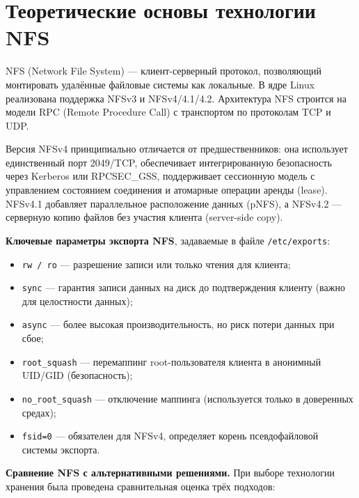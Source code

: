 \documentclass[14pt,a4paper]{extarticle}
\begin{document}
	\newpage
	
	\section{Теоретические основы технологии NFS}
	
	NFS (Network File System) --- клиент-серверный протокол, позволяющий монтировать
	удалённые файловые системы как локальные. В ядре Linux реализована поддержка NFSv3 и
	NFSv4/4.1/4.2. Архитектура NFS строится на модели RPC (Remote Procedure Call) с
	транспортом по протоколам TCP и UDP.
	
	Версия NFSv4 принципиально отличается от предшественников: она использует единственный
	порт 2049/TCP, обеспечивает интегрированную безопасность через Kerberos или
	RPCSEC\_GSS, поддерживает сессионную модель с управлением состоянием соединения и
	атомарные операции аренды (lease). NFSv4.1 добавляет параллельное расположение данных
	(pNFS), а NFSv4.2 --- серверную копию файлов без участия клиента (server-side copy).
	
	\textbf{Ключевые параметры экспорта NFS}, задаваемые в файле \texttt{/etc/exports}:
	
	\begin{itemize}
		\item \texttt{rw / ro} --- разрешение записи или только чтения для клиента;
		\item \texttt{sync} --- гарантия записи данных на диск до подтверждения клиенту
		(важно для целостности данных);
		\item \texttt{async} --- более высокая производительность, но риск потери данных при
		сбое;
		\item \texttt{root\_squash} --- перемаппинг root-пользователя клиента в анонимный
		UID/GID (безопасность);
		\item \texttt{no\_root\_squash} --- отключение маппинга (используется только в
		доверенных средах);
		\item \texttt{fsid=0} --- обязателен для NFSv4, определяет корень псевдофайловой
		системы экспорта.
	\end{itemize}
	
	\textbf{Сравнение NFS с альтернативными решениями.}
	При выборе технологии хранения была проведена сравнительная оценка трёх подходов:
	
\end{document}
